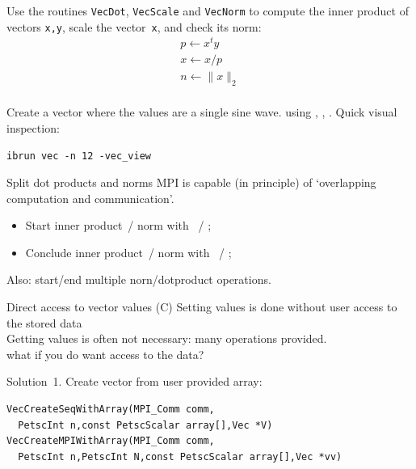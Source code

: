 \begin{longstory}

\begin{exerciseframe}[ortho]
Use the routines \lstinline{VecDot}, \lstinline{VecScale} and \lstinline{VecNorm} to
compute the inner product of vectors \lstinline{x,y}, scale the vector~\lstinline{x},
and check its norm:
\[
\begin{array}{l}
p \leftarrow x^ty\\
x \leftarrow x/p\\
n \leftarrow \|x\|_2\\
\end{array}
\]
\end{exerciseframe}

\begin{exerciseframe}[vec]
  Create a vector where the values are a single sine wave.
  using , ,
  .
  Quick visual inspection:
\begin{verbatim}
ibrun vec -n 12 -vec_view
\end{verbatim}
\end{exerciseframe}

\begin{details}
\begin{numberedframe}{Split dot products and norms}
  MPI is capable (in principle) of `overlapping computation and communication'.
  \begin{itemize}
  \item Start inner product~/ norm with ~/
    ;
  \item Conclude inner product~/ norm with ~/
    ;
  \end{itemize}
  Also: start/end multiple norn/dotproduct operations.
\end{numberedframe}
\end{details}

\begin{details}
\begin{numberedframe}{Direct access to vector values (C)}
 Setting values is done without user access to the stored data\\
 Getting values is often not necessary: many operations provided.\\
 what if you do want access to the data?

 Solution~1. Create vector from user provided array:
\begin{lstlisting}
VecCreateSeqWithArray(MPI_Comm comm,
  PetscInt n,const PetscScalar array[],Vec *V)
VecCreateMPIWithArray(MPI_Comm comm,
  PetscInt n,PetscInt N,const PetscScalar array[],Vec *vv)
\end{lstlisting}
\end{numberedframe}


\end{details}
\end{longstory}
